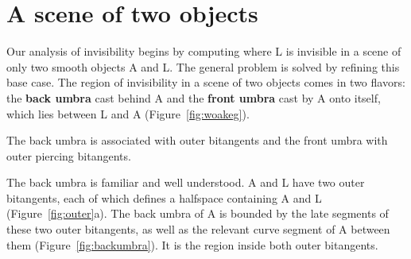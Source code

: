 \documentclass[9pt,twocolumn]{article}
\newif\ifJournal
\newif\ifComment
\begin{document}

\section{A scene of two objects}
\label{sec:single}

\ifComment
  The computation of visibility is better, or more constructively,
  approached as the computation of blocking.
  When L is alone in the scene, everything is visible and nothing is blocked.
  As objects are added to the scene, how much more of L
  becomes blocked and therefore invisible?
  Seen from this perspective, the base case for object visibility is
  the scene composed of two objects, the object of interest L and a single blocking object A
  This section considers this base case.
\fi

Our analysis of invisibility begins by
computing where L is invisible in a scene of only two smooth objects A and L.
The general problem is solved by refining this base case.
The region of invisibility in a scene of two objects comes in two flavors:
the {\bf back umbra} cast behind A and 
the {\bf front umbra} cast by A onto itself, which lies between L and A
(Figure~\ref{fig:woakeg}).
\ifJournal
The penumbra comes in two analogous flavors.
\fi
The back umbra is associated with outer bitangents and the front umbra
with outer piercing bitangents.




The back umbra is familiar and well understood.
A and L have two outer bitangents,
each of which defines a halfspace containing A and L (Figure~\ref{fig:outer}a).
The back umbra of A is bounded by the late segments of these two outer bitangents,
as well as the relevant curve segment of A between them
(Figure~\ref{fig:backumbra}).
It is the region inside both outer bitangents.
\end{document}
